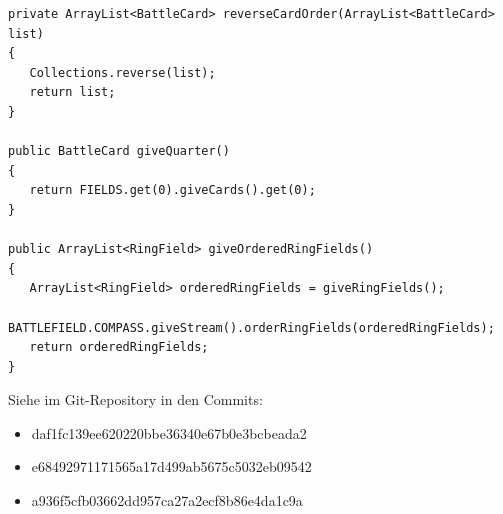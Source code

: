 \begin{lstlisting}
private ArrayList<BattleCard> reverseCardOrder(ArrayList<BattleCard> list)
{
   Collections.reverse(list);
   return list;
}

public BattleCard giveQuarter()
{
   return FIELDS.get(0).giveCards().get(0);
}

public ArrayList<RingField> giveOrderedRingFields()
{
   ArrayList<RingField> orderedRingFields = giveRingFields();
   BATTLEFIELD.COMPASS.giveStream().orderRingFields(orderedRingFields);
   return orderedRingFields;
}
\end{lstlisting}

Siehe im Git-Repository in den Commits:
\begin{itemize}
\item daf1fc139ee620220bbe36340e67b0e3bcbeada2
\item e68492971171565a17d499ab5675c5032eb09542
\item a936f5cfb03662dd957ca27a2ecf8b86e4da1c9a
\end{itemize}